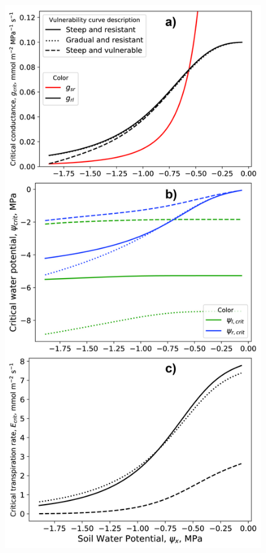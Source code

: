 \documentclass[utf8]{frontiersSCNS} %
\begin{document}
\begin{figure}[h]
    \begin{center}
        \includegraphics[scale=0.12]{g_psi_E_psix.jpg}
    \end{center}

\end{figure}
\end{document}
